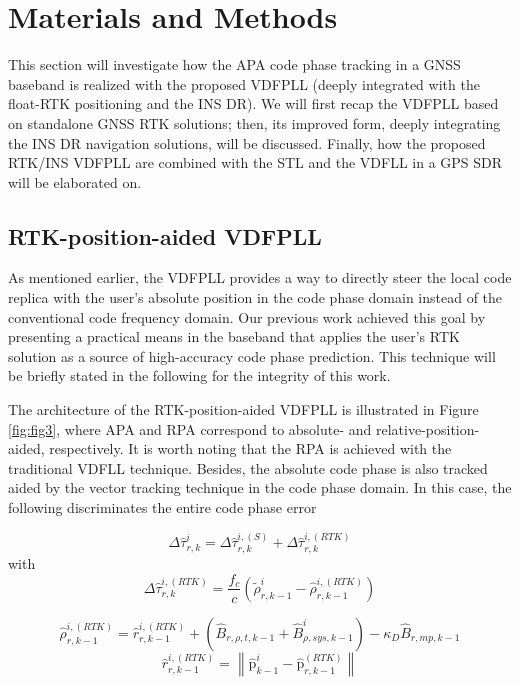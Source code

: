 \documentclass{article}
\newcommand{\reffig}[1]{Figure \ref{#1}}
\begin{document}
\section{Materials and Methods}
\label{sec2}
This section will investigate how the APA code phase tracking in a GNSS baseband is realized with the proposed VDFPLL (deeply integrated with the float-RTK positioning and the INS DR). We will first recap the VDFPLL based on standalone GNSS RTK solutions; then, its improved form, deeply integrating the INS DR navigation solutions, will be discussed. Finally, how the proposed RTK/INS VDFPLL are combined with the STL and the VDFLL in a GPS SDR will be elaborated on.

\subsection{RTK-position-aided VDFPLL}
As mentioned earlier, the VDFPLL provides a way to directly steer the local code replica with the user's absolute position in the code phase domain instead of the conventional code frequency domain. Our previous work achieved this goal by presenting a practical means in the baseband that applies the user's RTK solution as a source of high-accuracy code phase prediction. This technique will be briefly stated in the following for the integrity of this work. 

The architecture of the RTK-position-aided VDFPLL is illustrated in \reffig{fig:fig3}, where APA and RPA correspond to absolute- and relative-position-aided, respectively. It is worth noting that the RPA is achieved with the traditional VDFLL technique. Besides, the absolute code phase is also tracked aided by the vector tracking technique in the code phase domain. In this case, the following discriminates the entire code phase error 

\begin{equation}
\label{GrindEQ__1_}
\Delta {\hat{\tau }}^i_{r,k}=\Delta {\hat{\tau }}^{i,\left(S\right)}_{r,k}+\Delta {\hat{\tau }}^{i,\left(RTK\right)}_{r,k} 
\end{equation}
with
\begin{equation}
\label{GrindEQ__2_}
\Delta{\hat{\tau}}^{i,\left(RTK\right)}_{r,k}=\frac{f_c}{c}\left({\tilde{\rho}}^i_{r,k-1}-{\hat{\rho}}^{i,\left(RTK\right)}_{r,k-1}\right) 
\end{equation}

\begin{equation*}
{\hat{\rho}}^{i,\left(RTK\right)}_{r,k-1}={\hat{r}}^{i,\left(RTK\right)}_{r,k-1}+\left({\hat{B}}_{r,\rho,t,k-1}+{\hat{B}}^i_{\rho,sys,k-1}\right)-{\kappa }_D{\hat{B}}_{r,mp,k-1}
\end{equation*}
\begin{equation*}
{\hat{r}}^{i,\left(RTK\right)}_{r,k-1}=\left\|{\hat{\boldsymbol{\mathrm{p}}}}^i_{k-1}-{\hat{\boldsymbol{\mathrm{p}}}}^{\left(RTK\right)}_{r,k-1}\right\|
\end{equation*}
\end{document}
